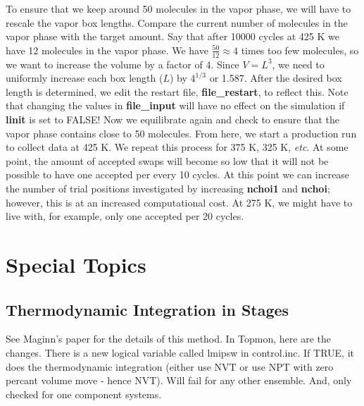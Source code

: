 \documentclass[12pt,letterpaper]{article}
\begin{document}
To ensure that we keep around 50 molecules in the vapor
phase, we will have to rescale the vapor box lengths.
Compare the current number of molecules in the vapor phase
with the target amount. Say that after 10000 cycles at 425 K
we have 12 molecules in the vapor phase. We have
$\frac{50}{12} \approx 4$ times too few molecules, so we
want to increase the volume by a factor of 4. Since $V=L^3$,
we need to uniformly increase each box length ($L$) by
$4^{1/3}$ or 1.587. After the desired box length is
determined, we edit the restart file, {\bf file\_restart},
to reflect this. Note that changing the values in {\bf
  file\_input} will have no effect on the simulation if {\bf
  linit} is set to FALSE! Now we equilibrate again and check
to ensure that the vapor phase contains close to 50
molecules. From here, we start a production run to collect
data at 425 K. We repeat this process for 375 K, 325 K, {\it
  etc}. At some point, the amount of accepted swaps will
become so low that it will not be possible to have one
accepted per every 10 cycles. At this point we can increase
the number of trial positions investigated by increasing
{\bf nchoi1} and {\bf nchoi}; however, this is at an
increased computational cost. At 275 K, we might have to
live with, for example, only one accepted per 20 cycles.

\section{Special Topics}
\subsection{Thermodynamic Integration in Stages}
See Maginn's paper for the details of this method. In
Topmon, here are the changes. There is a new logical
variable called lmipsw in control.inc. If TRUE, it does the
thermodynamic integration (either use NVT or use NPT with
zero percant volume move - hence NVT). Will fail for any
other ensemble. And, only checked for one component systems.
\end{document}
